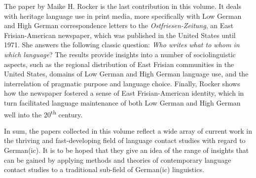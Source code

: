 \documentclass[output=paper]{langsci/langscibook}
\begin{document}
The paper by {Maike} {H.} {Rocker} is the last contribution in this volume. It deals with heritage language use in print media, more specifically with Low German and High German correspondence letters to the \textit{Ostfriesen-Zeitung}, an East Frisian-American newspaper, which was published in the United States until 1971. She answers the following classic question: \textit{Who writes what to whom in which language}? The results provide insights into a number of sociolinguistic aspects, such as the regional distribution of East Frisian communities in the United States, domains of Low German and High German language use, and the interrelation of pragmatic purpose and language choice. Finally, Rocker shows how the newspaper fostered a sense of East Frisian-American identity, which in turn facilitated language maintenance of both Low German and High German well into the 20\textsuperscript{th} century.

In sum, the papers collected in this volume reflect a wide array of current work in the thriving and fast-developing field of language contact studies with regard to German(ic). It is to be hoped that they give an idea of the range of insights that can be gained by applying methods and theories of contemporary language contact studies to a traditional sub-field of German(ic) linguistics.



{\sloppy\printbibliography[heading=subbibliography,notkeyword=this]}
\end{document}
